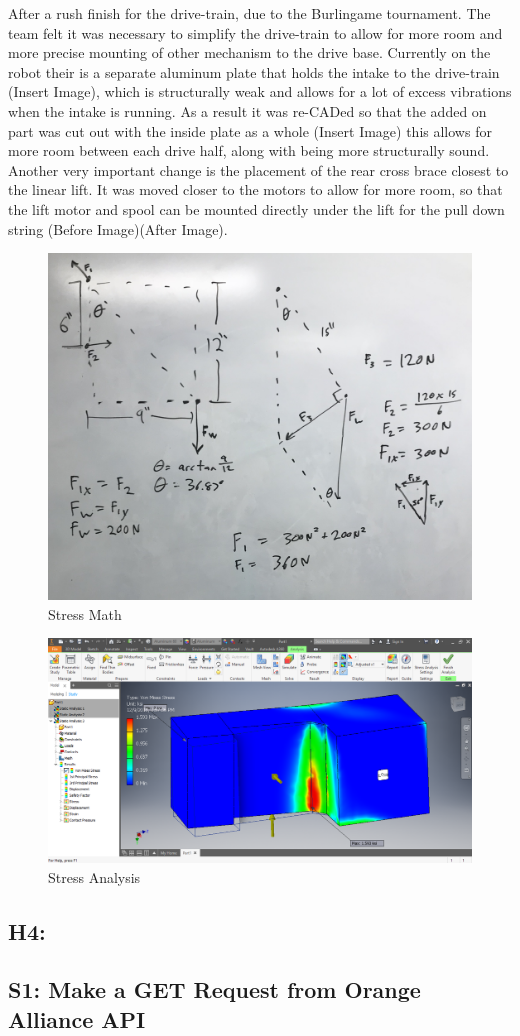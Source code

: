 \documentclass{article}
\begin{document}
{After a rush finish for the drive-train, due to the Burlingame tournament. The team felt it was necessary to simplify the drive-train to allow for more room and more precise mounting of other mechanism to the drive base. Currently on the robot their is a separate aluminum plate that holds the intake to the drive-train (Insert Image), which is structurally  weak and allows for a lot of excess vibrations when the intake is running. As a result it was re-CADed so that the added on part was cut out with the inside plate as a whole (Insert Image) this allows for more room between each drive half, along with being more structurally sound. Another very important change is the placement of the rear cross brace closest to the linear lift. It was moved closer to the motors to allow for more room, so that the lift motor and spool can be mounted directly under the lift for the pull down string (Before Image)(After Image). 

\begin{figure}
    \centering
    \includegraphics[width=.6 \textwidth]{14_12-03/images/Math.jpg}
    \caption{Stress Math}
    \label{fig:math}
\end{figure}

\begin{figure}
    \centering
    \includegraphics[width=.6\textwidth]{14_12-03/images/Stress_Analysis.png}
    \caption{Stress Analysis}
    \label{fig:stress}
\end{figure}
\subsection{H4: }
}\subsection{S1: Make a GET Request from Orange Alliance API}
\end{document}
